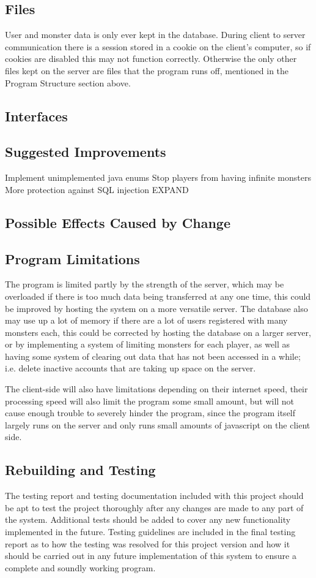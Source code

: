 \documentclass{project}
\begin{document}
\subsection{Files}
User and monster data is only ever kept in the database. During client to server communication there is a session stored in a cookie on the client's computer, so if cookies are disabled this may not function correctly. Otherwise the only other files kept on the server are files that the program runs off, mentioned in the Program Structure section above.
\subsection{Interfaces}

\subsection{Suggested Improvements}
Implement unimplemented java enums
Stop players from having infinite monsters
More protection against SQL injection
EXPAND
\subsection{Possible Effects Caused by Change}

\subsection{Program Limitations}
The program is limited partly by the strength of the server, which may be overloaded if there is too much data being transferred at any one time, this could be improved by hosting the system on a more versatile server. The database also may use up a lot of memory if there are a lot of users registered with many monsters each, this could be corrected by hosting the database on a larger server, or by implementing a system of limiting monsters for each player, as well as having some system of clearing out data that has not been accessed in a while; i.e. delete inactive accounts that are taking up space on the server.

The client-side will also have limitations depending on their internet speed, their processing speed will also limit the program some small amount, but will not cause enough trouble to severely hinder the program, since the program itself largely runs on the server and only runs small amounts of javascript on the client side.

\subsection{Rebuilding and Testing}
The testing report and testing documentation included with this project should be apt to test the project thoroughly after any changes are made to any part of the system. Additional tests should be added to cover any new functionality implemented in the future. Testing guidelines are included in the final testing report as to how the testing was resolved for this project version and how it should be carried out in any future implementation of this system to ensure a complete and soundly working program.
\end{document}
